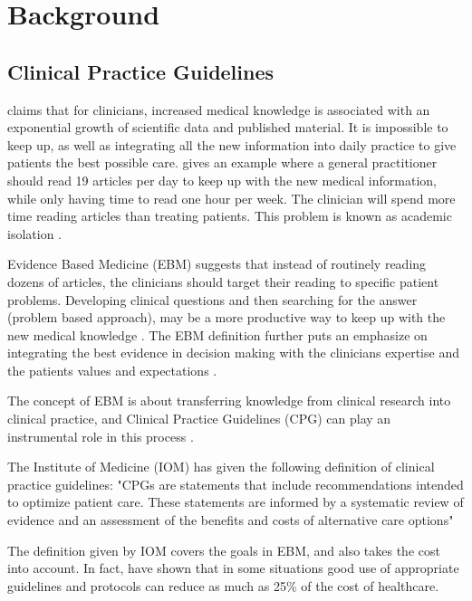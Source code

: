 \chapter{Background}
\section{Clinical Practice Guidelines}
\textcite{Fervers2010} claims that for clinicians, increased medical knowledge is associated with an exponential growth of scientific data and published material. It is impossible to keep up, as well as integrating all the new information into daily practice to give patients the best possible care.  \textcite{Masic2008} gives an example where a general practitioner should read 19 articles per day to keep up with the new medical information, while only having time to read one hour per week. The clinician will spend more time reading articles than treating patients. This problem is known as academic isolation \parencite{Masic2008}.

Evidence Based Medicine (EBM) suggests that instead of routinely reading dozens of articles, the clinicians should target their reading to specific patient problems. Developing clinical questions and then searching for the answer (problem based approach), may be a more productive way to keep up with the new medical knowledge \parencite{Masic2008}. The EBM definition further puts an emphasize on integrating the best evidence in decision making with the clinicians expertise and the patients values and expectations \parencite{Masic2008}. 

The concept of EBM is about transferring knowledge from clinical research into clinical practice, and Clinical Practice Guidelines (CPG) can play an instrumental role in this process \parencite{Fervers2010}.

The Institute of Medicine (IOM) has given the following definition of clinical practice guidelines: "CPGs are statements that include recommendations intended to optimize patient care. These statements are informed by a systematic review of evidence and an assessment of the benefits and costs of alternative care options" \parencite{Guidelines2011}

The definition given by IOM covers the goals in EBM, and also takes the cost into account. In fact, \textcite{Clayton1995} have shown that in some situations good use of appropriate guidelines and protocols can reduce as much as 25\% of the cost of healthcare.


